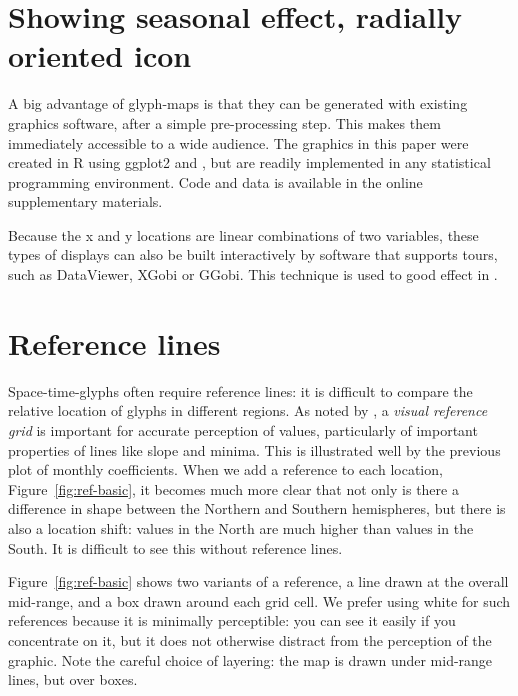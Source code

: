 \documentclass[oneside]{article}
\begin{document}
\section{Showing seasonal effect, radially oriented icon}

A big advantage of glyph-maps is that they can be generated with existing graphics software, after a simple pre-processing step. This makes them immediately accessible to a wide audience. The graphics in this paper were created in R \citep{R} using ggplot2 \citep{me:ggplot2,wickham:2007d} and \citep{me:plyr}, but are readily implemented in any statistical programming environment.  Code and data is available in the online supplementary materials.

Because the x and y locations are linear combinations of two variables, these types of displays can also be built interactively by software that supports tours, such as DataViewer, XGobi or GGobi.  This technique is used to good effect in \citet{buja:1996a}.

\section{Reference lines}

Space-time-glyphs often require reference lines: it is difficult to compare the relative location of glyphs in different regions. As noted by \citet{cleveland:1993a}, a \emph{visual reference grid} is important for accurate perception of values, particularly of important properties of lines like slope and minima. This is illustrated well by the previous plot of monthly coefficients. When we add a reference to each location, Figure~\ref{fig:ref-basic}, it becomes much more clear that not only is there a difference in shape between the Northern and Southern hemispheres, but there is also a location shift: values in the North are much higher than values in the South. It is difficult to see this without reference lines.

Figure~\ref{fig:ref-basic} shows two variants of a reference, a line drawn at the overall mid-range, and a box drawn around each grid cell. We prefer using white for such references because it is minimally perceptible: you can see it easily if you concentrate on it, but it does not otherwise distract from the perception of the graphic. Note the careful choice of layering: the map is drawn under mid-range lines, but over boxes.
\end{document}
